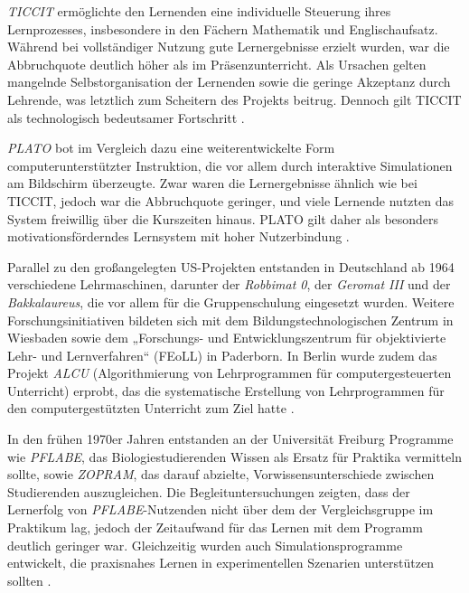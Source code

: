 \textit{TICCIT} ermöglichte den Lernenden eine individuelle Steuerung ihres Lernprozesses, insbesondere in den Fächern Mathematik und Englischaufsatz. Während bei vollständiger Nutzung gute Lernergebnisse erzielt wurden, war die Abbruchquote deutlich höher als im Präsenzunterricht. Als Ursachen gelten mangelnde Selbstorganisation der Lernenden sowie die geringe Akzeptanz durch Lehrende, was letztlich zum Scheitern des Projekts beitrug. Dennoch gilt TICCIT als technologisch bedeutsamer Fortschritt \parencites[S.~71]{oshea_lernen_1986}[S.~13]{schonfeld_computerbasiertes_2006}.

\textit{PLATO} bot im Vergleich dazu eine weiterentwickelte Form computerunterstützter Instruktion, die vor allem durch interaktive Simulationen am Bildschirm überzeugte. Zwar waren die Lernergebnisse ähnlich wie bei TICCIT, jedoch war die Abbruchquote geringer, und viele Lernende nutzten das System freiwillig über die Kurszeiten hinaus. PLATO gilt daher als besonders motivationsförderndes Lernsystem mit hoher Nutzerbindung \parencites[S.~75f]{oshea_lernen_1986}[S.~14]{schonfeld_computerbasiertes_2006}.

Parallel zu den großangelegten US-Projekten entstanden in Deutschland ab 1964 verschiedene Lehrmaschinen, darunter der \textit{Robbimat 0}, der \textit{Geromat III} und der \textit{Bakkalaureus}, die vor allem für die Gruppenschulung eingesetzt wurden. Weitere Forschungsinitiativen bildeten sich mit dem Bildungstechnologischen Zentrum in Wiesbaden sowie dem „Forschungs- und Entwicklungszentrum für objektivierte Lehr- und Lernverfahren“ (FEoLL) in Paderborn. In Berlin wurde zudem das Projekt \textit{ALCU} (Algorithmierung von Lehrprogrammen für computergesteuerten Unterricht) erprobt, das die systematische Erstellung von Lehrprogrammen für den computergestützten Unterricht zum Ziel hatte \parencites[S.~10]{niegemann_kompendium_2008}[S.~11]{schonfeld_computerbasiertes_2006}.

In den frühen 1970er Jahren entstanden an der Universität Freiburg Programme wie \textit{PFLABE}, das Biologiestudierenden Wissen als Ersatz für Praktika vermitteln sollte, sowie \textit{ZOPRAM}, das darauf abzielte, Vorwissensunterschiede zwischen Studierenden auszugleichen. Die Begleituntersuchungen zeigten, dass der Lernerfolg von \textit{PFLABE}-Nutzenden nicht über dem der Vergleichsgruppe im Praktikum lag, jedoch der Zeitaufwand für das Lernen mit dem Programm deutlich geringer war. Gleichzeitig wurden auch Simulationsprogramme entwickelt, die praxisnahes Lernen in experimentellen Szenarien unterstützen sollten \parencite[S.~11]{niegemann_kompendium_2008}.

